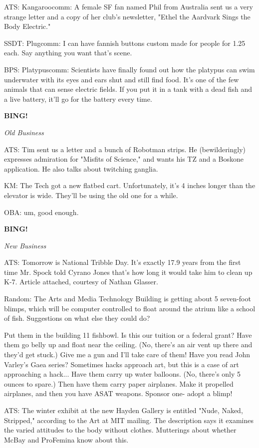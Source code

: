 \documentclass[12pt]{article}
\newcommand{\bing}{{\bf BING!} }
\newcommand{\goto}[1]{\bing \vskip 12pt \centerline{{\em{#1}}}}
\begin{document}
ATS: Kangaroocomm: A female SF fan named Phil from Australia sent us a very strange letter and a copy of her club's newsletter, "Ethel the Aardvark Sings the Body Electric."

SSDT: Plugcomm: I can have fannish buttons custom made for people for 1.25 each. Say anything you want that's scene.

BPS: Platypuscomm: Scientists have finally found out how the platypus can swim underwater with its eyes and ears shut and still find food. It's one of the few animals that can sense electric fields. If you put it in a tank with a dead fish and a live battery, it'll go for the battery every time.

\goto{Old Business}

ATS: Tim sent us a letter and a bunch of Robotman strips. He (bewilderingly) expresses admiration for "Misfits of Science," and wants his TZ and a Boskone application. He also talks about twitching ganglia.

KM: The Tech got a new flatbed cart. Unfortunately, it's 4 inches longer than the elevator is wide. They'll be using the old one for a while.

OBA: um, good enough.

\goto{New Business}

ATS: Tomorrow is National Tribble Day. It's exactly 17.9 years from the first time Mr. Spock told Cyrano Jones that's how long it would take him to clean up K-7. Article attached, courtesy of Nathan Glasser.

Random: The Arts and Media Technology Building is getting about 5 seven-foot blimps, which will be computer controlled to float around the atrium like a school of fish. Suggestions on what else they could do?

Put them in the building 11 fishbowl. Is this our tuition or a federal grant? Have them go belly up and float near the ceiling. (No, there's an air vent up there and they'd get stuck.) Give me a gun and I'll take care of them! Have you read John Varley's Gaea series? Sometimes hacks approach art, but this is a case of art approaching a hack... Have them carry up water balloons. (No, there's only 5 ounces to spare.) Then have them carry paper airplanes. Make it propelled airplanes, and then you have ASAT weapons. Sponsor one- adopt a blimp!

ATS: The winter exhibit at the new Hayden Gallery is entitled "Nude, Naked, Stripped," according to the Art at MIT mailing. The description says it examines the varied attitudes to the body without clothes. Mutterings about whether McBay and ProFemina know about this.
\end{document}
